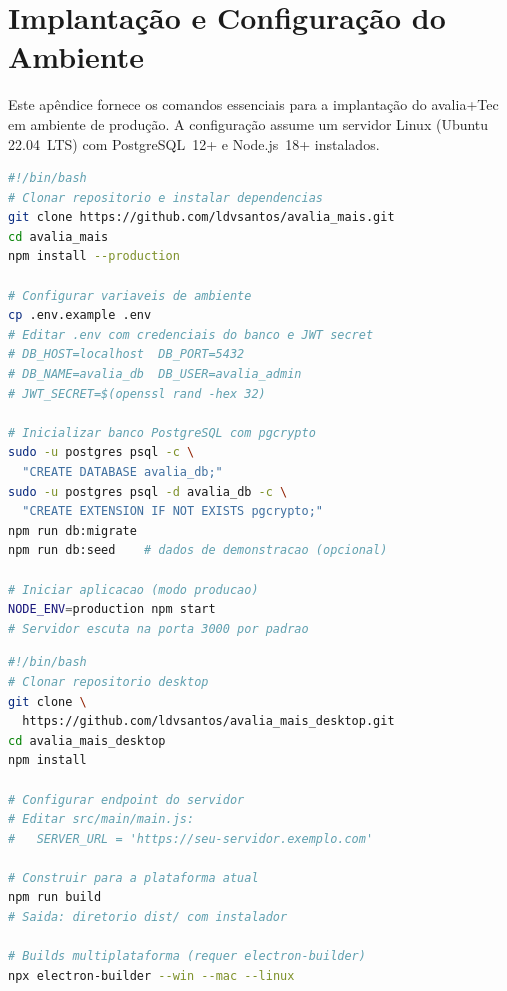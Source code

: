 \documentclass[preprint,12pt,a4paper]{elsarticle}
\begin{document}
\appendix

\section{Implantação e Configuração do Ambiente}
\label{app:deployment}

Este apêndice fornece os comandos essenciais para a implantação do avalia+Tec em ambiente de produção. A configuração assume um servidor Linux (Ubuntu 22.04~LTS) com PostgreSQL~12+ e Node.js~18+ instalados.

\begin{lstlisting}[language=sh, caption={Implantação do backend e portal web do avalia+Tec no servidor. O script clona o repositório, instala dependências, configura o banco de dados e inicia a aplicação.}, label=lst:deploy]
#!/bin/bash
# Clonar repositorio e instalar dependencias
git clone https://github.com/ldvsantos/avalia_mais.git
cd avalia_mais
npm install --production

# Configurar variaveis de ambiente
cp .env.example .env
# Editar .env com credenciais do banco e JWT secret
# DB_HOST=localhost  DB_PORT=5432
# DB_NAME=avalia_db  DB_USER=avalia_admin
# JWT_SECRET=$(openssl rand -hex 32)

# Inicializar banco PostgreSQL com pgcrypto
sudo -u postgres psql -c \
  "CREATE DATABASE avalia_db;"
sudo -u postgres psql -d avalia_db -c \
  "CREATE EXTENSION IF NOT EXISTS pgcrypto;"
npm run db:migrate
npm run db:seed    # dados de demonstracao (opcional)

# Iniciar aplicacao (modo producao)
NODE_ENV=production npm start
# Servidor escuta na porta 3000 por padrao
\end{lstlisting}

\begin{lstlisting}[language=sh, caption={Construção do aplicativo desktop Electron para avaliadores. Produz instaladores específicos por plataforma para Windows, macOS e Linux.}, label=lst:desktopbuild]
#!/bin/bash
# Clonar repositorio desktop
git clone \
  https://github.com/ldvsantos/avalia_mais_desktop.git
cd avalia_mais_desktop
npm install

# Configurar endpoint do servidor
# Editar src/main/main.js:
#   SERVER_URL = 'https://seu-servidor.exemplo.com'

# Construir para a plataforma atual
npm run build
# Saida: diretorio dist/ com instalador

# Builds multiplataforma (requer electron-builder)
npx electron-builder --win --mac --linux
\end{lstlisting}



\end{document}
